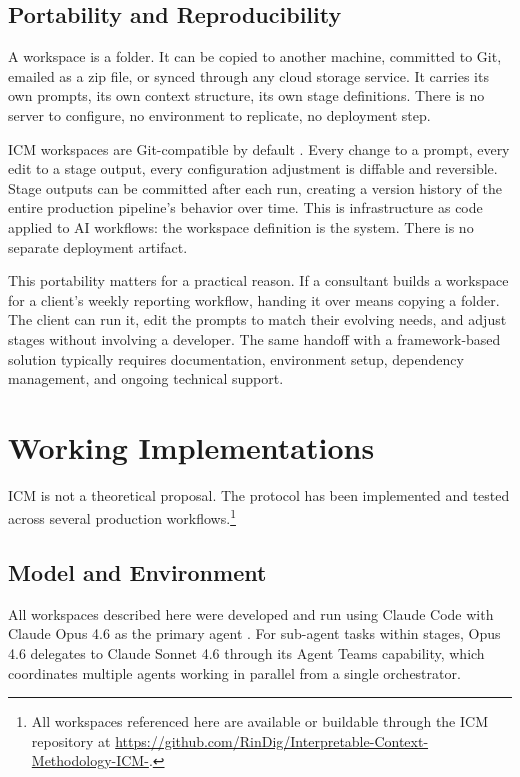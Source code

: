\documentclass[acmlarge,nonacm,screen]{acmart}
\begin{document}
\subsection{Portability and Reproducibility}

A workspace is a folder. It can be copied to another machine, committed to Git, emailed as a zip file, or synced through any cloud storage service. It carries its own prompts, its own context structure, its own stage definitions. There is no server to configure, no environment to replicate, no deployment step.

ICM workspaces are Git-compatible by default \cite{chacon2014}. Every change to a prompt, every edit to a stage output, every configuration adjustment is diffable and reversible. Stage outputs can be committed after each run, creating a version history of the entire production pipeline's behavior over time. This is infrastructure as code \cite{morris2021} applied to AI workflows: the workspace definition is the system. There is no separate deployment artifact.

This portability matters for a practical reason. If a consultant builds a workspace for a client's weekly reporting workflow, handing it over means copying a folder. The client can run it, edit the prompts to match their evolving needs, and adjust stages without involving a developer. The same handoff with a framework-based solution typically requires documentation, environment setup, dependency management, and ongoing technical support.

\section{Working Implementations}

ICM is not a theoretical proposal. The protocol has been implemented and tested across several production workflows.\footnote{All workspaces referenced here are available or buildable through the ICM repository at \url{https://github.com/RinDig/Interpretable-Context-Methodology-ICM-}.}

\subsection{Model and Environment}

All workspaces described here were developed and run using Claude Code with Claude Opus 4.6 as the primary agent \cite{anthropic2026opus}. For sub-agent tasks within stages, Opus 4.6 delegates to Claude Sonnet 4.6 through its Agent Teams capability, which coordinates multiple agents working in parallel from a single orchestrator.
\end{document}
